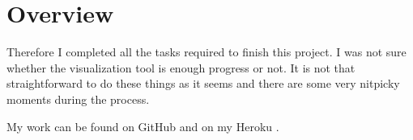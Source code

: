\documentclass[a4paper,12pt]{article}
\begin{document}
\section{Overview}

\par Therefore I completed all the tasks required to finish this project. I was 
not sure whether the visualization tool is enough progress or not. It is not that
straightforward to do these things as it seems and there are some very nitpicky
moments during the process.

\vspace{.2cm}

\par My work can be found on GitHub \cite{qbeer} and on my Heroku \cite{deployed_app}.

\newpage


\end{document}
